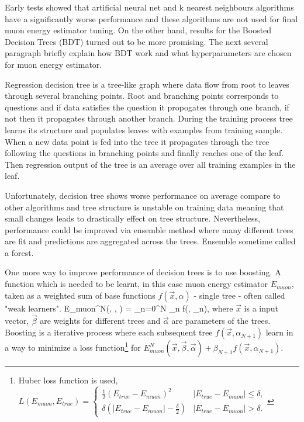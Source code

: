 Early tests showed that artificial neural net and k nearest neighbours algorithms have a 
significantly worse performance and these algorithms are not used for final muon energy 
estimator tuning. On the other hand, results for the Boosted Decision Trees (BDT) turned out
to be more promising. The next several paragraph briefly explain how BDT work and what 
hyperparameters are chosen for muon energy estimator.

Regression decision tree is a tree-like graph where data flow from root to leaves through 
several branching points. Root and branching points corresponds to questions and if data 
satisfies the question it propogates through one branch, if not then it propagates through
another branch. During the training process tree learns its structure and populates leaves 
with examples from training sample. When a new data point is fed into the tree it propagates
through the tree following the questions in branching points and finally reaches one of the leaf. 
Then regression output of the tree is an average over all training examples in the leaf. 

Unfortunately, decision tree shows worse performance on average compare to other algorithms 
and tree structure is unstable on training data meaning that small changes leads to drastically 
effect on tree structure. Nevertheless, performance could be improved via ensemble method 
where many different trees are fit and predictions are aggregated across the trees. Ensemble 
sometime called a forest.

One more way to improve performance of decision trees is to use boosting. A function which is 
needed to be learnt, in this case muon energy estimator $E_{muon}$, taken as a weighted sum of 
base functions $f(\vec{x}, \alpha)$ - single tree - often called "weak learners". 
\be
E_{muon}^N(, \vec{\beta}, \vec{\alpha}) = \sum_{n=0}^N \beta_n f(, \alpha_n),
\ee
where $\vec{x}$ is a input vector, $\vec{\beta}$ are weights for different trees and $\vec{\alpha}$
are parameters of the trees. Boosting is a iterative process where each subsequent tree 
$f(\vec{x}, \alpha_{N+1})$ learn in a way to minimize a loss function\footnote{Huber loss function
is used,
$
L(E_{muon}, E_{true}) = \begin{cases}
				\frac{1}{2}(E_{true} - E_{muon})^2 & |E_{true} - E_{muon}| \leq \delta, \\
				\delta(|E_{true} - E_{muon}| - \frac{\delta}{2}) & |E_{true} - E_{muon}| > \delta.
			\end{cases}
$} for $E_{muon}^N(\vec{x}, \vec{\beta}, \vec{\alpha}) + \beta_{N+1}f(\vec{x}, \alpha_{N+1})$.

